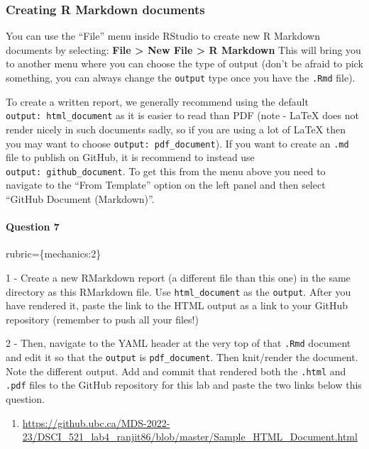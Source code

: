 \documentclass[
]{article}
\providecommand{\tightlist}{%
  \setlength{\itemsep}{0pt}\setlength{\parskip}{0pt}}
\begin{document}
\hypertarget{creating-r-markdown-documents}{%
\subsubsection{Creating R Markdown
documents}\label{creating-r-markdown-documents}}

You can use the ``File'' menu inside RStudio to create new R Markdown
documents by selecting: \textbf{File \textgreater{} New File
\textgreater{} R Markdown} This will bring you to another menu where you
can choose the type of output (don't be afraid to pick something, you
can always change the \texttt{output} type once you have the
\texttt{.Rmd} file).

To create a written report, we generally recommend using the default
\texttt{output:\ html\_document} as it is easier to read than PDF (note
- LaTeX does not render nicely in such documents sadly, so if you are
using a lot of LaTeX then you may want to choose
\texttt{output:\ pdf\_document}). If you want to create an \texttt{.md}
file to publish on GitHub, it is recommend to instead use
\texttt{output:\ github\_document}. To get this from the menu above you
need to navigate to the ``From Template'' option on the left panel and
then select ``GitHub Document (Markdown)''.

\begin{alert alert-info}
\hypertarget{question-7}{%
\paragraph{Question 7}\label{question-7}}

rubric=\{mechanics:2\}

1 - Create a new RMarkdown report (a different file than this one) in
the same directory as this RMarkdown file. Use \texttt{html\_document}
as the \texttt{output}. After you have rendered it, paste the link to
the HTML output as a link to your GitHub repository (remember to push
all your files!)

2 - Then, navigate to the YAML header at the very top of that
\texttt{.Rmd} document and edit it so that the \texttt{output} is
\texttt{pdf\_document}. Then knit/render the document. Note the
different output. Add and commit that rendered both the \texttt{.html}
and \texttt{.pdf} files to the GitHub repository for this lab and paste
the two links below this question.
\end{alert alert-info}

\begin{enumerate}
\def\labelenumi{\arabic{enumi}.}
\tightlist
\item
  \url{https://github.ubc.ca/MDS-2022-23/DSCI_521_lab4_ranjit86/blob/master/Sample_HTML_Document.html}
\end{enumerate}
\end{document}
